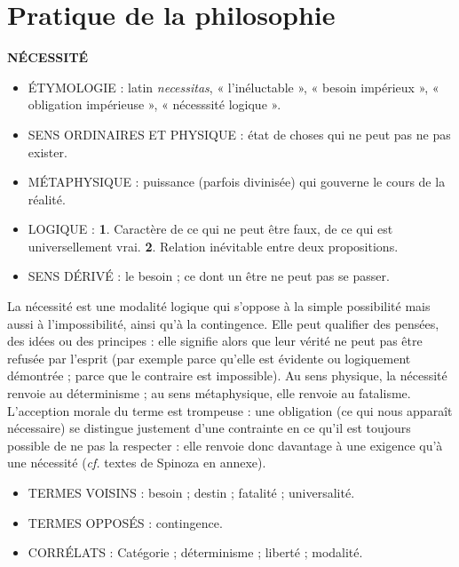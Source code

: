 
\section{Pratique de la philosophie}

{\bf NÉCESSITÉ}

\begin{itemize}[leftmargin=1cm, label=, itemsep=1pt]
\item {\footnotesize ÉTYMOLOGIE} : latin {\it necessitas}, « l'inéluctable », « besoin impérieux », « obligation impérieuse », « nécesssité logique ».
\item {\footnotesize SENS ORDINAIRES ET PHYSIQUE} : état de choses qui ne peut pas ne pas exister.
\item {\footnotesize MÉTAPHYSIQUE} : puissance (parfois divinisée) qui gouverne le cours
de la réalité.
\item {\footnotesize LOGIQUE} : {\bf 1}. Caractère de ce qui ne peut être faux, de
ce qui est universellement vrai. {\bf 2}. Relation inévitable entre deux propositions.
\item {\footnotesize SENS DÉRIVÉ} : le besoin ; ce dont un être ne peut pas
se passer.
\end{itemize}

La nécessité est une modalité logique
qui s'oppose à la simple possibilité mais
aussi à l'impossibilité, ainsi qu'à la
contingence. Elle peut qualifier des
pensées, des idées ou des principes :
elle signifie alors que leur vérité ne peut
pas être refusée par l'esprit (par
exemple parce qu'elle est évidente ou
logiquement démontrée ; parce que le
contraire est impossible). Au sens physique, la nécessité renvoie au déterminisme ; au sens métaphysique, elle renvoie au fatalisme. L'acception morale
du terme est trompeuse : une obligation
(ce qui nous apparaît nécessaire) se distingue justement d'une contrainte en ce
qu'il est toujours possible de ne pas la
respecter : elle renvoie donc davantage
à une exigence qu'à une nécessité ({\it cf.}
textes de Spinoza en annexe).

\begin{itemize}[leftmargin=1cm, label=, itemsep=1pt]
\item {\footnotesize TERMES VOISINS} : besoin ; destin ; fatalité ; universalité.
\item {\footnotesize TERMES OPPOSÉS} : contingence.
\item {\footnotesize CORRÉLATS} : Catégorie ; déterminisme ; liberté ; modalité.
\end{itemize}


